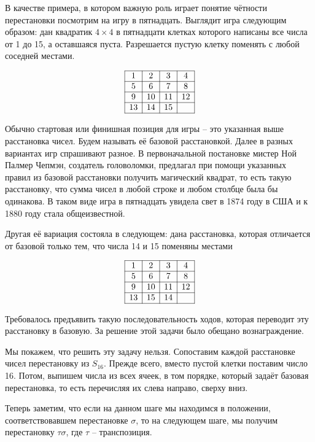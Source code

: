 \documentclass[10pt,a4paper,oneside]{book}
\theoremstyle{definition}
\begin{document}
В качестве примера, в котором важную роль играет понятие чётности перестановки посмотрим на игру в пятнадцать. Выглядит игра следующим образом: дан квадратик $4\times 4$ в пятнадцати клетках которого написаны все числа от 1 до 15, а оставшаяся пуста. Разрешается пустую клетку поменять с любой соседней местами.

$$\begin{array}{|c|c|c|c|}
\hline
1 & 2 & 3 & 4\\
\hline
5 & 6 & 7 & 8\\
\hline
9& 10& 11& 12\\
\hline
13& 14& 15&\\
\hline
\end{array}
$$

Обычно стартовая или финишная позиция для игры -- это указанная выше расстановка чисел. Будем называть её базовой расстановкой.
Далее в разных вариантах игр спрашивают разное. В первоначальной постановке мистер Ной Палмер Чепмэн, создатель головоломки, предлагал при помощи указанных правил из базовой расстановки получить магический квадрат, то есть такую расстановку, что сумма чисел в любой строке и любом столбце была бы одинакова. В таком виде игра в пятнадцать увидела свет в 1874 году в США и к 1880 году стала общеизвестной. 

Другая её вариация состояла в следующем: дана расстановка, которая отличается от базовой только тем, что числа 14 и 15 поменяны местами

$$\begin{array}{|c|c|c|c|}
\hline
1 & 2 & 3 & 4\\
\hline
5 & 6 & 7 & 8\\
\hline
9& 10& 11& 12\\
\hline
13& 15& 14&\\
\hline
\end{array}
$$

Требовалось предъявить такую последовательность ходов, которая переводит эту расстановку в базовую. За решение этой задачи было обещано вознаграждение.

Мы покажем, что решить эту задачу нельзя. Сопоставим каждой расстановке чисел перестановку из $S_{16}$. Прежде всего, вместо пустой клетки поставим число 16. Потом, выпишем числа из всех ячеек, в том порядке, который задаёт базовая перестановка, то есть перечисляя их слева направо, сверху вниз.

Теперь заметим, что если на данном шаге мы находимся в положении, соответствовавшем перестановке $\sigma$, то на следующем шаге, мы получим перестановку $\tau \sigma$, где $\tau$ -- транспозиция.
\end{document}
